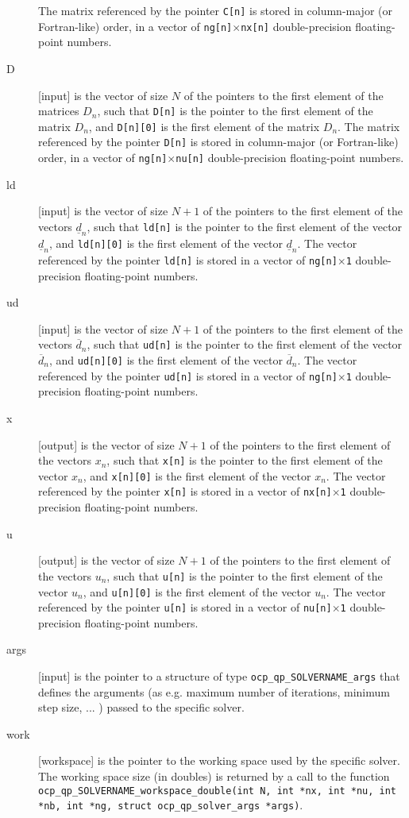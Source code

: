 \documentclass{report}
\begin{document}
\begin{description}
The matrix referenced by the pointer {\tt C[n]} is stored in column-major (or Fortran-like) order, in a vector of {\tt ng[n]$\times$nx[n]} double-precision floating-point numbers.
\item[D] [input] is the vector of size $N$ of the pointers to the first element of the matrices $D_n$, such that {\tt D[n]} is the pointer to the first element of the matrix $D_n$, and {\tt D[n][0]} is the first element of the matrix $D_n$.
The matrix referenced by the pointer {\tt D[n]} is stored in column-major (or Fortran-like) order, in a vector of {\tt ng[n]$\times$nu[n]} double-precision floating-point numbers.
\item[ld] [input] is the vector of size $N+1$ of the pointers to the first element of the vectors $\underline d_n$, such that {\tt ld[n]} is the pointer to the first element of the vector $\underline d_n$, and {\tt ld[n][0]} is the first element of the vector $\underline d_n$.
The vector referenced by the pointer {\tt ld[n]} is stored in a vector of {\tt ng[n]$\times$1} double-precision floating-point numbers.
\item[ud] [input] is the vector of size $N+1$ of the pointers to the first element of the vectors $\overline d_n$, such that {\tt ud[n]} is the pointer to the first element of the vector $\overline d_n$, and {\tt ud[n][0]} is the first element of the vector $\overline d_n$.
The vector referenced by the pointer {\tt ud[n]} is stored in a vector of {\tt ng[n]$\times$1} double-precision floating-point numbers.
\item[x] [output] is the vector of size $N+1$ of the pointers to the first element of the vectors $x_n$, such that {\tt x[n]} is the pointer to the first element of the vector $x_n$, and {\tt x[n][0]} is the first element of the vector $x_n$.
The vector referenced by the pointer {\tt x[n]} is stored in a vector of {\tt nx[n]$\times$1} double-precision floating-point numbers.
\item[u] [output] is the vector of size $N+1$ of the pointers to the first element of the vectors $u_n$, such that {\tt u[n]} is the pointer to the first element of the vector $u_n$, and {\tt u[n][0]} is the first element of the vector $u_n$.
The vector referenced by the pointer {\tt u[n]} is stored in a vector of {\tt nu[n]$\times$1} double-precision floating-point numbers.
\item[args] [input] is the pointer to a structure of type {\tt ocp\_qp\_SOLVERNAME\_args} that defines the arguments (as e.g. maximum number of iterations, minimum step size, ... ) passed to the specific solver.
\item[work] [workspace] is the pointer to the working space used by the specific solver.
The working space size (in doubles) is returned by a call to the function {\tt ocp\_qp\_SOLVERNAME\_workspace\_double(int N, int *nx, int *nu, int *nb, int *ng, struct ocp\_qp\_solver\_args *args)}. 
\end{description}
\end{document}
